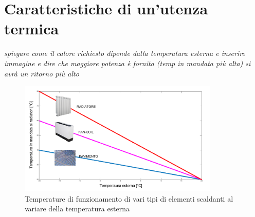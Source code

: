 \documentclass[laurea,oneside,11pt]{USiena_tesiLM}
\begin{document}
\section{Caratteristiche di un'utenza termica}

\textit{spiegare come il calore richiesto dipende dalla temperatura esterna e inserire immagine e dire che maggiore potenza è fornita (temp in mandata più alta) si avrà un ritorno più alto}

\begin{figure}[!ht]
\centering
\includegraphics[width=0.85\textwidth]{figure/elem_scaldanti} 
\caption{Temperature di funzionamento di vari tipi di elementi scaldanti al variare della temperatura esterna}
\label{fig:elem_scaldanti}
\end{figure}


%

%
\end{document}
